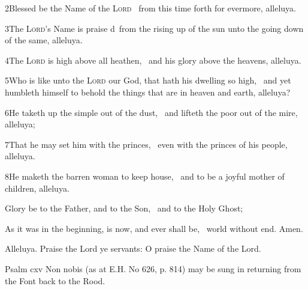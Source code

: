 2\enspace Blessed be the Name of the {\scshape Lord} \star\  from this time forth for evermore, alleluya.

3\enspace The {\scshape Lord}’s Name is praise d\star\  from the rising up of the sun unto the going down of the same, alleluya.

4\enspace The {\scshape Lord} is high above all heathen, \star\  and his glory above the heavens, alleluya.

5\enspace Who is like unto the {\scshape Lord} our God, that hath his dwelling so high, \star\  and yet humbleth himself 
to behold the things that are in heaven and earth, alleluya?

6\enspace He taketh up the simple out of the dust, \star\  and lifteth the poor out of the mire, alleluya;

7\enspace That he may set him with the princes, \star\  even with the princes of his people, alleluya.

8\enspace He maketh the barren woman to keep house, \star\  and to be a joyful mother of children, alleluya.

Glory be to the Father, and to the Son, \star\  and to the Holy Ghost;

As it was in the beginning, is now, and ever shall be, \star\  world without end. Amen.

\centerline{}


\medskip


Alleluya.  \V Praise the Lord ye servants: O praise the Name of the Lord.

Psalm cxv Non nobis (as at E.H. No 626, p. 814) may be sung in returning from the Font back to the Rood.

\centerline{}

\medskip


\fleuron


